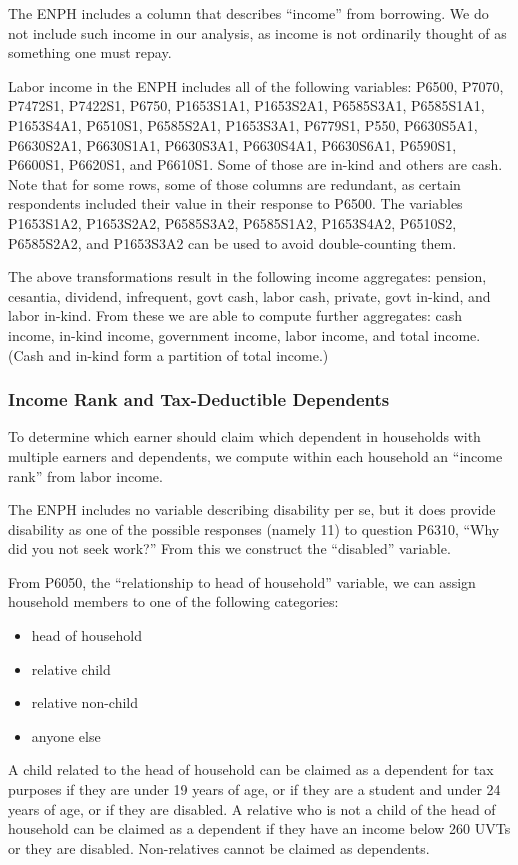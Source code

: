 \documentclass[12pt]{article}
\begin{document}
\begin{appendices}
The ENPH includes a column that describes ``income'' from borrowing.
We do not include such income in our analysis,
as income is not ordinarily thought of as something one must repay.

Labor income in the ENPH includes all of the following variables:
P6500,
P7070,
P7472S1,
P7422S1,
P6750,
P1653S1A1,
P1653S2A1,
P6585S3A1,
P6585S1A1,
P1653S4A1,
P6510S1,
P6585S2A1,
P1653S3A1,
P6779S1,
P550,
P6630S5A1,
P6630S2A1,
P6630S1A1,
P6630S3A1,
P6630S4A1,
P6630S6A1,
P6590S1,
P6600S1,
P6620S1,
and P6610S1.
Some of those are in-kind and others are cash.
Note that for some rows, some of those columns are redundant,
as certain respondents included their value in their response to P6500.
The variables
P1653S1A2,
P1653S2A2,
P6585S3A2,
P6585S1A2,
P1653S4A2,
P6510S2,
P6585S2A2,
and P1653S3A2 can be used to avoid double-counting them.

The above transformations result in the following income aggregates:
pension,
cesantia,
dividend,
infrequent,
govt cash,
labor cash,
private,
govt in-kind,
and labor in-kind.
From these we are able to compute further aggregates:
cash income,
in-kind income,
government income,
labor income,
and total income.
(Cash and in-kind form a partition of total income.)

\subsubsection {Income Rank and Tax-Deductible Dependents}
To determine which earner should claim which dependent
in households with multiple earners and dependents,
we compute within each household an ``income rank'' from labor income.

The ENPH includes no variable describing disability per se,
but it does provide disability as one of the possible responses (namely 11)
to question P6310, ``Why did you not seek work?''
From this we construct the ``disabled'' variable.

From P6050, the ``relationship to head of household'' variable,
we can assign household members to one of the following categories:
\begin{itemize}
\item head of household
\item relative child
\item relative non-child
\item anyone else
\end{itemize}

A child related to the head of household
can be claimed as a dependent for tax purposes
if they are under 19 years of age,
or if they are a student and under 24 years of age,
or if they are disabled.
A relative who is not a child of the head of household
can be claimed as a dependent
if they have an income below 260 UVTs or they are disabled.
Non-relatives cannot be claimed as dependents.



\end{appendices}
\end{document}
